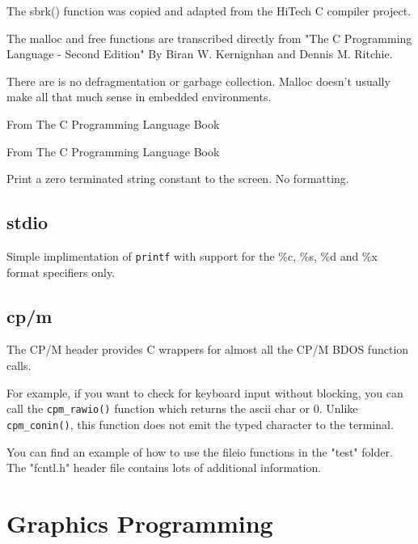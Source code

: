 \documentclass[10pt,a4paper,hidelinks]{article}
\begin{document}
The sbrk() function was copied and adapted from the HiTech C compiler project.

The malloc and free functions are transcribed directly from "The C Programming
Language - Second Edition" By Biran W. Kernignhan and Dennis M. Ritchie.

There are is no defragmentation or garbage collection.  Malloc doesn't usually
make all that much sense in embedded environments.

\begin{description}[font=$\bullet$~\normalfont\scshape\color{red!50!black}]
  \item[abs]
  \item[exit]
  \item[free] From The C Programming Language Book
  \item[itoa]
  \item[malloc] From The C Programming Language Book
  \item[puts] Print a zero terminated string constant to the screen.  No
    formatting.
\end{description}

\subsection{stdio}

\begin{description}[font=$\bullet$~\normalfont\scshape\color{red!50!black}]
  \item[printf] Simple implimentation of \texttt{printf} with support for the
    \%c, \%s, \%d and \%x format specifiers only.
\end{description}

\subsection{cp/m}
The CP/M header provides C wrappers for almost all the CP/M BDOS function calls.

For example, if you want to check for keyboard input without blocking, you can
call the \texttt{cpm\_rawio()} function which returns the ascii char or 0.
Unlike \texttt{cpm\_conin()}, this function does not emit the typed character to
the terminal.

You can find an example of how to use the fileio functions in the "test"
folder.  The "fcntl.h" header file contains lots of additional information.

\break
\section{Graphics Programming} \label{graphicsprogramming}
\end{document}
